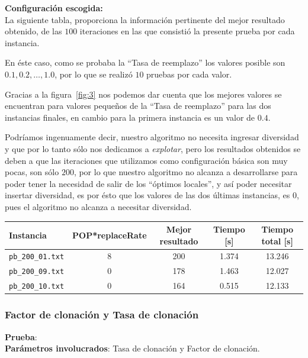 \textbf{Configuración escogida:}\\

La siguiente tabla, proporciona la información pertinente del mejor resultado obtenido,
de las $100$ iteraciones en las que consistió la presente prueba por cada instancia.

En éste caso, como se probaba la ``Tasa de reemplazo'' los valores posible son $0.1, 0.2, \ldots, 1.0$,
por lo que se realizó $10$ pruebas por cada valor.

Gracias a la figura~\ref{fig:3} nos podemos dar cuenta que los mejores valores se encuentran
para valores pequeños de la ``Tasa de reemplazo'' para las dos instancias finales, en cambio
para la primera instancia es un valor de $0.4$.

Podríamos ingenuamente decir, nuestro algoritmo no necesita ingresar diversidad y que por lo tanto
sólo nos dedicamos a \emph{explotar}, pero los resultados obtenidos se deben a que las iteraciones
que utilizamos como configuración básica son muy pocas, son sólo $200$, por lo que nuestro algoritmo
no alcanza a desarrollarse para poder tener la necesidad de salir de los ``óptimos locales'',
y así poder necesitar insertar diversidad, es por ésto que los valores de las dos últimas instancias,
es 0, pues el algoritmo no alcanza a necesitar diversidad.

\begin{center}
\begin{tabular}{|l|c|c|c|c|}
	\hline
	\textbf{Instancia} & \textbf{POP*replaceRate} & \textbf{Mejor resultado} & \textbf{Tiempo [s]} & \textbf{Tiempo total [s]}\\\hline
	\texttt{pb\_200\_01.txt} & 8 & 200 & 1.374 & 13.246 \\\hline
	\texttt{pb\_200\_09.txt} & 0 & 178 & 1.463 & 12.027 \\\hline
	\texttt{pb\_200\_10.txt} & 0 & 164 & 0.515 & 12.133   \\\hline
\end{tabular}
\end{center}

\newpage
\subsubsection{Factor de clonación y Tasa de clonación}

\textbf{Prueba}:  \\

\textbf{Parámetros involucrados}: Tasa de clonación y Factor de clonación. \\

